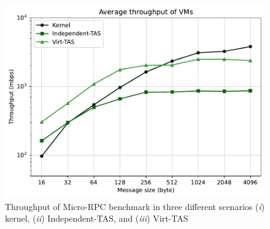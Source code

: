 \begin{figure}
    \centering
    \includegraphics[scale=0.8]{../results/multiplex.throughput.pdf}
    \caption{Throughput of Micro-RPC benchmark in three different scenarios (\emph{i}) kernel, 
    (\emph{ii}) Independent-TAS, and (\emph{iii}) Virt-TAS}
    \label{fig:multiplex.throughput}
\end{figure}
